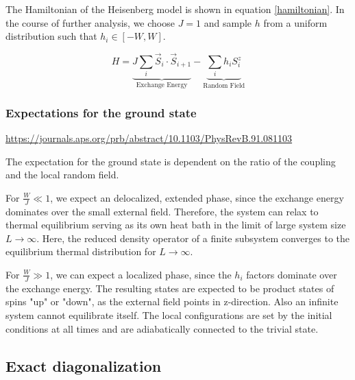 \documentclass[reprint,amsmath,amssymb,aps,prb]{revtex4-2}
\begin{document}
The Hamiltonian of the Heisenberg model is shown in equation \ref{hamiltonian}. In the course of further analysis, we choose $J=1$ and sample $h$ from a uniform distribution such that $h_i \in \left[-W, W\right]$.

\begin{equation}
	H=\underbrace{J\sum_i \vec{S}_i\cdot\vec{S}_{i+1}}_{\text{Exchange Energy}}-\underbrace{\sum_ih_iS_i^z}_{\text{Random Field}}\label{hamiltonian}
\end{equation}


\subsubsection{Expectations for the ground state}
\url{https://journals.aps.org/prb/abstract/10.1103/PhysRevB.91.081103}


The expectation for the ground state is dependent on the ratio of the coupling and the local random field. 

For $\frac{W}{J} \ll 1$, we expect an delocalized, extended phase, since the exchange energy dominates over the small external field. Therefore, the system can relax to thermal equilibrium serving as its own heat bath in the limit of large system size $L\rightarrow\infty$.
Here, the reduced density operator of a finite subsystem converges to the equilibrium thermal distribution
for $L\rightarrow\infty$.\cite{Pal2010}

For $\frac{W}{J} \gg 1$, we can expect a localized phase, since the $h_i$ factors dominate over the exchange energy. The resulting states are expected to be product states of spins "up" or "down", as the external field points in z-direction. Also an infinite system cannot equilibrate itself. The local configurations are set by the initial conditions at all times and are adiabatically connected to the trivial state.\cite{Pal2010}


\subsection{Exact diagonalization}
\end{document}
